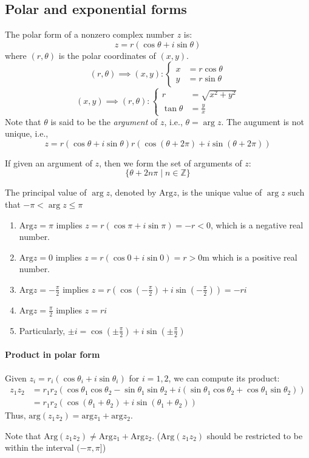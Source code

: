 \subsection{Polar and exponential forms}
\begin{definition}
The polar form of a nonzero complex number $z$ is:
\[
z = r(\cos\theta + i\sin\theta)
\]
where $(r,\theta)$ is the polar coordinates of $(x,y)$.
\[
(r,\theta)\implies (x,y):\left\{
\begin{aligned}
x&=r\cos\theta\\
y&=r\sin\theta
\end{aligned}
\right.
\]
\[
(x,y)\implies (r,\theta):\left\{
\begin{aligned}
r&=\sqrt{x^2+y^2}\\
\tan\theta&=\frac{y}{x}
\end{aligned}
\right.
\]
Note that $\theta$ is said to be the \emph{argument} of $z$, i.e., $\theta=\arg z$. The augument is not unique, i.e.,
\[
z = r(\cos\theta + i\sin\theta) 
 r(\cos(\theta+2\pi) + i\sin(\theta + 2\pi))
\]
\end{definition}
If given an argument of $z$, then we form the set of arguments of $z$:
\[
\{\theta+2n\pi\mid n\in\mathbb{Z}\}
\]
\begin{definition}
The principal value of $\arg z$, denoted by $\mbox{Arg} z$, is the unique value of $\arg z$ such that $-\pi<\arg z\le\pi$
\end{definition}
\begin{example}
\begin{enumerate}
\item
$\mbox{Arg}z=\pi$ implies $z = r(\cos\pi + i\sin\pi) = -r<0$, which is a negative real number.
\item
$\mbox{Arg}z=0$ implies $z=r(\cos0+i\sin0)=r>0$m which is a positive real number.
\item
$\mbox{Arg}z=-\frac{\pi}{2}$ implies $z=r(\cos(-\frac{\pi}{2})+i\sin(-\frac{\pi}{2}))=-ri$
\item
$\mbox{Arg}z = \frac{\pi}{2}$ implies $z = ri$
\item
Particularly, $\pm i = \cos(\pm \frac{\pi}{2}) + i\sin(\pm\frac{\pi}{2})$
\end{enumerate}
\end{example}

\paragraph{Product in polar form}
Given $z_i = r_i(\cos\theta_i+i\sin\theta_i)$ for $i=1,2$, we can compute its product:
\begin{align*}
z_1z_2 &=r_1r_2(\cos\theta_1\cos\theta_2-\sin\theta_1\sin\theta_2 + i(\sin\theta_1\cos\theta_2+\cos\theta_1\sin\theta_2))\\
&=r_1r_2(\cos(\theta_1+\theta_2) + i\sin(\theta_1+\theta_2))
\end{align*}
Thus, $\mbox{arg}(z_1z_2) = \mbox{arg}z_1+\mbox{arg}z_2$.
\begin{remark}
Note that $\mbox{Arg}(z_1z_2)\ne\mbox{Arg}z_1 +\mbox{Arg}z_2$. ($\mbox{Arg}(z_1z_2)$ should be restricted to be within the interval $(-\pi,\pi]$)
\end{remark}

